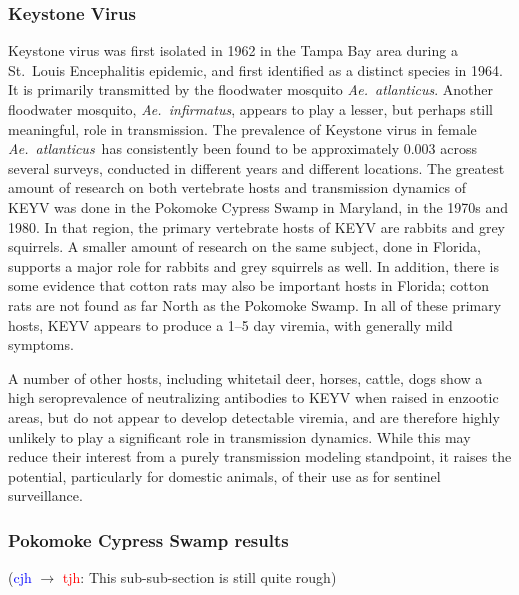 \documentclass[12pt]{article}
\newcommand{\atl}{\textit{Ae.\ atlanticus}}
\newcommand{\cjh}{\textcolor{blue}{cjh}}
\newcommand{\tjh}{\textcolor{red}{tjh}}
\newcommand{\msg}[3]{(#1 $\rightarrow$ #2: #3)}
\newcommand{\mct}[1]{\msg\cjh\tjh{#1}}
\begin{document}
            \subsubsection{Keystone Virus}
                Keystone virus was first isolated in 1962 in the Tampa Bay area during a St.\ Louis Encephalitis epidemic\cite{chamberlain1969arbovirus, taylor1971california}, and first identified as a distinct species in 1964\cite{bond1966california}. It is primarily transmitted by the floodwater mosquito \atl. Another floodwater mosquito, \textit{Ae.~infirmatus}, appears to play a lesser, but perhaps still meaningful, role in transmission\cite{taylor1971california}. The prevalence of Keystone virus in female \atl\ has consistently been found to be approximately 0.003 across several surveys, conducted in different years and different locations\cite{watts1988maintenance,taylor1971california,leduc1975ecology,chamberlain1969arbovirus}. The greatest amount of research on both vertebrate hosts and transmission dynamics of KEYV was done in the Pokomoke Cypress Swamp in Maryland, in the 1970s and 1980\cite{watts1988maintenance}. In that region, the primary vertebrate hosts of KEYV are rabbits and grey squirrels\cite{watts1988maintenance}. A smaller amount of research on the same subject, done in Florida, supports a major role for rabbits and grey squirrels as well.\cite{jennings1970tamiami,jennings1968california} In addition, there is some evidence that cotton rats may also be important hosts in Florida\cite{jennings1970tamiami,taylor1971california}; cotton rats are not found as far North as the Pokomoke Swamp\cite{watts1982serologic}. In all of these primary hosts, KEYV appears to produce a 1--5 day viremia\cite{watts1988maintenance,jennings1968california}, with generally mild symptoms\cite{asdf}. %

                A number of other hosts, including whitetail deer, horses, cattle, dogs show a high seroprevalence of neutralizing antibodies to KEYV when raised in enzootic areas, but do not appear to develop detectable viremia, and are therefore highly unlikely to play a significant role in transmission dynamics.\cite{parkin1973occurrence,watts1982serologic,watts1979experimental} While this may reduce their interest from a purely transmission modeling standpoint, it raises the potential, particularly for domestic animals, of their use as for sentinel surveillance.\cite{parkin1973occurrence}

            \subsubsection{Pokomoke Cypress Swamp results}
                \label{pokomoke-results}
                \mct{This sub-sub-section is still quite rough}
\end{document}
